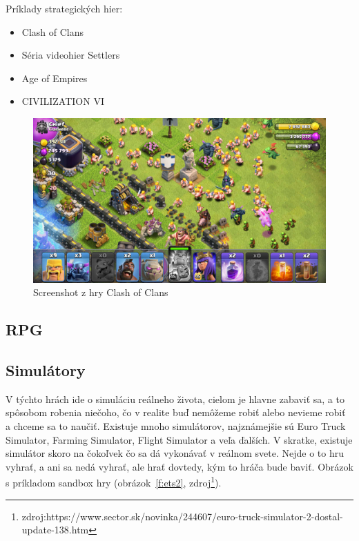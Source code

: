 \documentclass[10pt,oneside,slovak,a4paper]{article}
\begin{document}
Príklady strategických hier:
\begin{itemize}
\item Clash of Clans
\item Séria videohier Settlers
\item Age of Empires
\item CIVILIZATION VI
\end{itemize}

\begin{figure}[tbh]
\centering
\includegraphics[scale=0.25]{coc.jpg}
\caption{Screenshot z hry Clash of Clans}
\label{f:coc}
\end{figure}

\subsection{RPG} \label{zanre:rpg}



\subsection{Simulátory} \label{zanre:simulatory}

V týchto hrách ide o simuláciu reálneho života, cielom je hlavne zabaviť sa, a to spôsobom robenia niečoho, čo v realite buď nemôžeme robiť alebo nevieme robiť a chceme sa to naučiť. Existuje mnoho simulátorov, najznámejšie sú Euro Truck Simulator, Farming Simulator, Flight Simulator a veľa ďalších. V skratke, existuje simulátor skoro na čokoľvek čo sa dá vykonávať v reálnom svete. Nejde o to hru vyhrať, a ani sa nedá vyhrať, ale hrať dovtedy, kým to hráča bude baviť. Obrázok s príkladom sandbox hry (obrázok~\ref{f:ets2}, zdroj\footnote{zdroj:https://www.sector.sk/novinka/244607/euro-truck-simulator-2-dostal-update-138.htm}).
\end{document}
